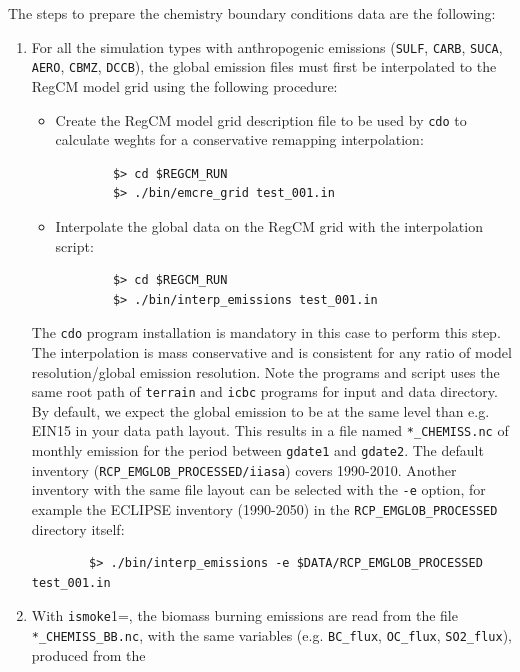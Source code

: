The steps to prepare the chemistry boundary conditions data are the following:

\begin{enumerate}
  \item For all the simulation types with anthropogenic emissions
    (\verb=SULF=, \verb=CARB=, \verb=SUCA=, \verb=AERO=, \verb=CBMZ=,
    \verb=DCCB=), the global emission files must first be interpolated to the
    RegCM model grid using the following procedure:
    \begin{itemize}
      \item Create the RegCM model grid description file to be used by
        \verb=cdo= to calculate weghts for a conservative remapping
        interpolation:
        \begin{Verbatim}
        $> cd $REGCM_RUN
        $> ./bin/emcre_grid test_001.in
        \end{Verbatim}
      \item Interpolate the global data on the RegCM grid with the interpolation
        script:
        \begin{Verbatim}
        $> cd $REGCM_RUN
        $> ./bin/interp_emissions test_001.in
        \end{Verbatim}
    \end{itemize}
    The \verb=cdo= program installation is mandatory in this case to perform
    this step. The interpolation is mass conservative and is consistent for
    any ratio of model resolution/global emission resolution.
    Note the programs and script uses the same root path of \verb=terrain= and
    \verb=icbc= programs for input and data directory. By default, we expect
    the global emission to be at the same level than e.g. EIN15 in your data
    path layout.
    This results in a file named \verb=*_CHEMISS.nc= of monthly emission for
    the period between \verb=gdate1= and \verb=gdate2=.
    The default inventory (\verb=RCP_EMGLOB_PROCESSED/iiasa=) covers
    1990-2010. Another inventory with the same file layout can be selected
    with the \verb=-e= option, for example the ECLIPSE inventory
    (1990-2050) in the \verb=RCP_EMGLOB_PROCESSED= directory itself:
        \begin{Verbatim}
        $> ./bin/interp_emissions -e $DATA/RCP_EMGLOB_PROCESSED test_001.in
        \end{Verbatim}
  \item With \verb=ismoke=1=, the biomass burning emissions are read from the
    file \verb=*_CHEMISS_BB.nc=, with the same variables (e.g.
    \verb=BC_flux=, \verb=OC_flux=, \verb=SO2_flux=), produced from the

\end{enumerate}
